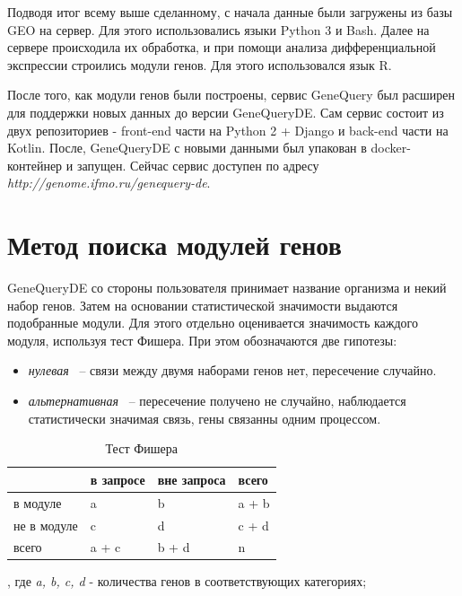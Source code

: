 \documentclass[times,specification,annotation]{itmo-student-thesis}
\begin{document}
Подводя итог всему выше сделанному, с начала данные были загружены из базы GEO на сервер. Для этого использовались языки Python 3 и Bash. Далее на сервере происходила их обработка, и при помощи анализа дифференциальной экспрессии строились модули генов. Для этого использовался язык R.

После того, как модули генов были построены, сервис GeneQuery был расширен для поддержки новых данных до версии GeneQueryDE. Сам сервис состоит из двух репозиториев - front-end части на Python 2 + Django и back-end части на Kotlin. После, GeneQueryDE с новыми данными был упакован в docker-контейнер и запущен. Сейчас сервис доступен по адресу \textit{http://genome.ifmo.ru/genequery-de}.

\section{Метод поиска модулей генов}

GeneQueryDE со стороны пользователя принимает название организма и некий набор генов. Затем на основании статистической значимости выдаются подобранные модули. Для этого отдельно оценивается значимость каждого модуля, используя тест Фишера. При этом обозначаются две гипотезы:
\begin{itemize}
    \item \textit{нулевая} ~-- связи между двумя наборами генов нет, пересечение случайно.
    \item \textit{альтернативная} ~-- пересечение получено не случайно, наблюдается статистически значимая связь, гены связанны одним процессом.
\end{itemize}

\begin{table}[!h]
    \caption{Тест Фишера}\label{fisherTable}
    \centering
    \begin{tabu}{ |X[l]|*{3}{X[c]|}}
        \hline
         & в запросе & вне запроса &  всего\strut\\ \hline
        в модуле & a & b &  a + b\\ \hline
        не в модуле & c & d &  c + d\\ \hline
         всего &  a + c &  b + d &  n\\ \hline
    \end{tabu}
\end{table}

, где \textit{a, b, c, d} - количества генов в соответствующих категориях​;
\end{document}
